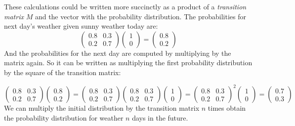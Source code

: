 \documentclass[
  letterpaper,
  DIV=11,
  numbers=noendperiod]{scrreprt}
\begin{document}
These calculations could be written more succinctly as a product of a
\emph{transition matrix} \(M\) and the vector with the probability
distribution. The probabilities for next day's weather given sunny
weather today are: \[  
\left(\begin{array}{cc}0.8& 0.3 \\0.2 & 0.7\end{array}\right)   \left(\begin{array}{c}1\\0 \end{array}\right) =  \left(\begin{array}{c} 0.8\\0.2\end{array}\right)  
\] And the probabilities for the next day are computed by multiplying by
the matrix again. So it can be written as multiplying the first
probability distribution by the square of the transition matrix:

\[ 
\left(\begin{array}{cc}0.8& 0.3 \\0.2 & 0.7\end{array}\right) \left(\begin{array}{c}0.8\\0.2 \end{array}\right) =   \left(\begin{array}{cc}0.8& 0.3 \\0.2 & 0.7\end{array}\right)  \left(\begin{array}{cc}0.8& 0.3 \\0.2 & 0.7\end{array}\right)  \left(\begin{array}{c}1\\0 \end{array}\right) =  \left(\begin{array}{cc}0.8& 0.3 \\0.2 & 0.7\end{array}\right) ^2  \left(\begin{array}{c}1\\0 \end{array}\right) = \left(\begin{array}{c} 0.7\\0.3\end{array}\right) 
\] We can multiply the initial distribution by the transition matrix
\(n\) times obtain the probability distribution for weather \(n\) days
in the future.
\end{document}
